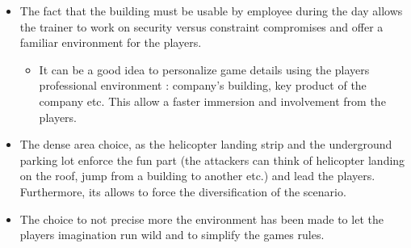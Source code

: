 \documentclass[11pt]{article} %
\begin{document}
\begin{itemize}
\item The fact that the building must be usable by employee during the day allows the trainer to work on security versus constraint compromises and offer a familiar environment for the players.
	\begin{itemize}	
	\item It can be a good idea to personalize game details using the players professional 
	environment : company's building, key product of the company etc. This allow a faster immersion
	and involvement from the players.
	\end{itemize}
\item The dense area choice, as the helicopter landing strip and the underground parking lot enforce the fun part (the attackers can think of helicopter landing on the roof, jump from a building to another etc.) and lead the players. Furthermore, its allows to force the diversification of the scenario. 
\item The choice to not precise more the environment has been made to let the players imagination run wild and to simplify the games rules.

\end{itemize}
\end{document}
